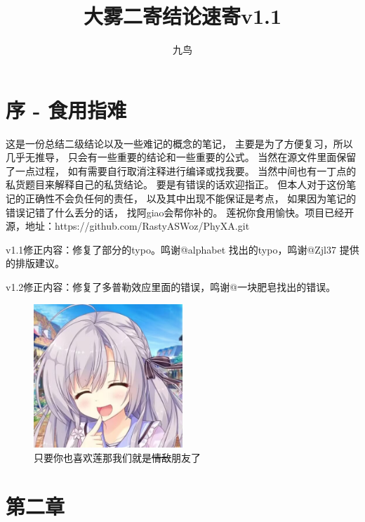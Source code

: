 \documentclass{ctexart}
\author{九鸟}
\title{大雾二寄结论速寄v1.1}
\date{}
\begin{document}
\maketitle
\section{序 - 食用指难}
这是一份总结二级结论以及一些难记的概念的笔记，
主要是为了方便复习，所以几乎无推导，
只会有一些重要的结论和一些重要的公式。
当然在源文件里面保留了一点过程，
如有需要自行取消注释进行编译或找我要。
当然中间也有一丁点的私货题目来解释自己的私货结论。
要是有错误的话欢迎指正。
但本人对于这份笔记的正确性不会负任何的责任，
以及其中出现不能保证是考点，
如果因为笔记的错误记错了什么丢分的话，
找阿giao会帮你补的。
莲祝你食用愉快。项目已经开源，地址：https://github.com/RastyASWoz/PhyXA.git


v1.1修正内容：修复了部分的typo。鸣谢@alphabet 找出的typo，鸣谢@Zjl37 提供的排版建议。


v1.2修正内容：修复了多普勒效应里面的错误，鸣谢@一块肥皂找出的错误。
\begin{figure}[H]
    \centering
    \includegraphics[width=0.5\textwidth]{img/lian.jpg}
    \caption[ ]{只要你也喜欢莲那我们就是\sout{情敌}朋友了}
\end{figure}
\section{第二章}
\end{document}
